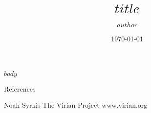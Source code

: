 \documentclass[aspectratio=32]{beamer}
\title{$title$}
\author{$author$}
\date{\today}
\begin{document}
\begin{frame}
  \titlepage
\end{frame}
$body$

\begin{frame}[allowframebreaks]{References}
  \begingroup
  \linespread{1.2}
  \scriptsize
  \printbibliography
  \endgroup
\end{frame}

\begin{frame}
  \begin{center}
    \vfill
    \large Noah Syrkis
    \vfill
    \large The Virian Project
    \vfill
    \large www.virian.org
    \vfill
  \end{center}
\end{frame}
\end{document}
